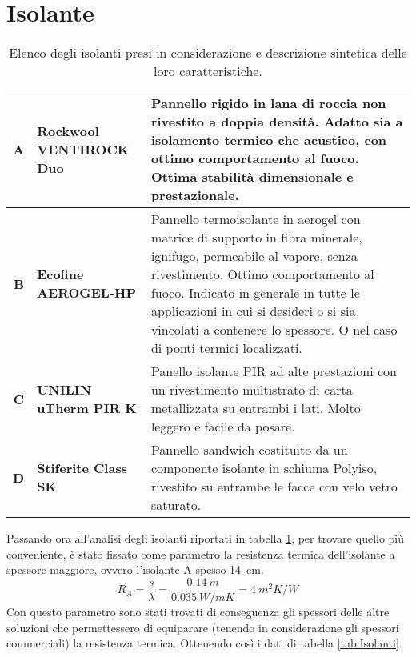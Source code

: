 \section{Isolante}
\begin{table}[htbp]
\caption{Elenco degli isolanti presi in considerazione e descrizione sintetica delle loro caratteristiche.}
\label{MaterialiISO}
\centering
\begin{tabularx}{\textwidth}{rXX}
    \toprule
        \textbf{A} & \textbf{Rockwool VENTIROCK Duo} & Pannello rigido in lana di roccia non rivestito a doppia densità. 
        Adatto sia a isolamento termico che acustico, con ottimo comportamento al fuoco. 
        Ottima stabilità dimensionale e prestazionale. \\\midrule
        \textbf{B} & \textbf{Ecofine AEROGEL-HP} & Pannello termoisolante in aerogel con matrice di supporto in fibra minerale, ignifugo, permeabile al vapore, senza rivestimento. 
        Ottimo comportamento al fuoco. 
        Indicato in generale in tutte le applicazioni in cui si desideri o si sia vincolati a contenere lo spessore. O nel caso di ponti termici localizzati.\\\midrule
        \textbf{C} & \textbf{UNILIN uTherm PIR K} & Panello isolante PIR ad alte prestazioni con un rivestimento multistrato di carta metallizzata su entrambi i lati. 
        Molto leggero e facile da posare.\\\midrule
        \textbf{D} & \textbf{Stiferite Class SK} & Pannello sandwich costituito da un componente isolante in schiuma Polyiso, rivestito su entrambe le facce con velo vetro saturato.\\
    \bottomrule
\end{tabularx}
\end{table}
Passando ora all'analisi degli isolanti riportati in tabella \ref{MaterialiISO}, per trovare quello più conveniente, è stato fissato come parametro la resistenza termica dell'isolante a spessore maggiore, ovvero l'isolante A spesso \SI{14}{\centi\metre}.
\[R_A = \frac{s}{\lambda}=\frac{\SI{0.14}{m}}{\SI{0.035}{W/mK}}=\SI{4}{m^2K\per W}\]
Con questo parametro sono stati trovati di conseguenza gli spessori delle altre soluzioni che permettessero di equiparare (tenendo in considerazione gli spessori commerciali) la resistenza termica. 
Ottenendo così i dati di tabella \ref{tab:Isolanti}.
